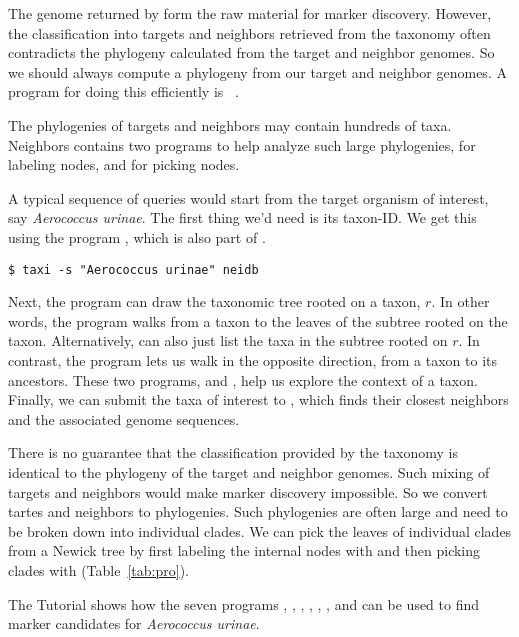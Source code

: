 The genome returned by  form the raw material for marker
discovery. However, the classification into targets and neighbors
retrieved from the taxonomy often contradicts the phylogeny calculated
from the target and neighbor genomes. So we should always compute a
phylogeny from our target and neighbor genomes. A program for doing
this efficiently is ~\cite{klo20:phy}.

The phylogenies of targets and neighbors may contain hundreds of
taxa. Neighbors contains two programs to help analyze such large
phylogenies,  for labeling nodes, and  for picking
nodes.






A typical sequence
of queries would start from the target organism of interest,
say \emph{Aerococcus urinae}. The first thing we'd need is its
taxon-ID. We get this using the program , which is also part
of .
\begin{verbatim}
$ taxi -s "Aerococcus urinae" neidb
\end{verbatim}
Next, the program  can draw the taxonomic tree rooted on a
taxon, $r$. In other words, the program  walks from a taxon
to the leaves of the subtree rooted on the
taxon. Alternatively,  can also just list the taxa in the
subtree rooted on $r$. In contrast, the program  lets us walk
in the opposite direction, from a taxon to its ancestors. These two
programs,  and , help us explore the context of a
taxon. Finally, we can submit the taxa of interest to ,
which finds their closest neighbors and the associated genome
sequences.

There is no guarantee that the classification provided by the taxonomy
is identical to the phylogeny of the target and neighbor genomes. Such
mixing of targets and neighbors would make marker discovery
impossible. So we convert tartes and neighbors to phylogenies. Such
phylogenies are often large and need to be broken down into individual
clades. We can pick the leaves of individual clades from a Newick tree
by first labeling the internal nodes with  and then picking
clades with  (Table~\ref{tab:pro}).

The Tutorial shows how the seven
programs , , , ,
, , and  can be used
to find marker candidates for \emph{Aerococcus urinae}.
